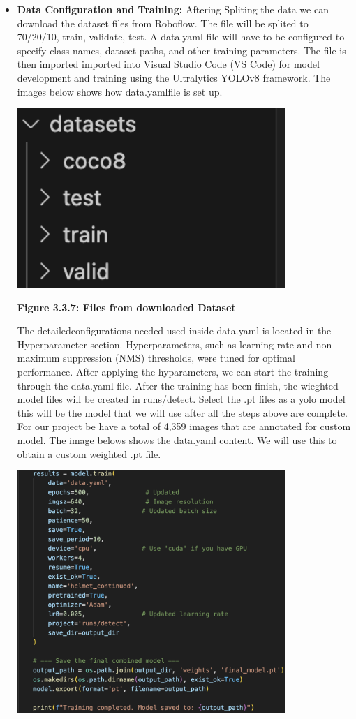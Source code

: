 \begin{itemize}
	\item \textbf{Data Configuration and Training:} Aftering Spliting the data we can download the dataset files from Roboflow. The file will be splited to 70/20/10, train, validate, test. A data.yaml file will have to be  configured to specify class names, dataset paths, and other training parameters. The file is then imported imported into Visual Studio Code (VS Code) for model development and training using the Ultralytics YOLOv8 framework. The images below shows how data.yamlfile is set up.
				\begin{center}
		\includegraphics[width=0.8\textwidth]{Files.png}
		
		\vspace{0.5em}
		\textbf{Figure 3.3.7:  Files from downloaded Dataset }
	\end{center}
	 The detailedconfigurations needed used inside data.yaml is located in the Hyperparameter section.
	 Hyperparameters, such as learning rate and non-maximum suppression (NMS) thresholds, were tuned for optimal performance.  After applying the hyparameters, we can start the training through the data.yaml file. After the training has been finish, the wieghted model files will be created in runs/detect. Select the .pt files as a yolo model this will be the model that we will use after all the steps above are complete. For our project be have a total of 4,359 images that are annotated for custom model. The image belows shows the data.yaml content. We will use this to obtain a custom weighted  .pt file.
	 				\begin{center}
	 	\includegraphics[width=0.8\textwidth]{yaml.png}
	 	

\end{center}
\end{itemize}
